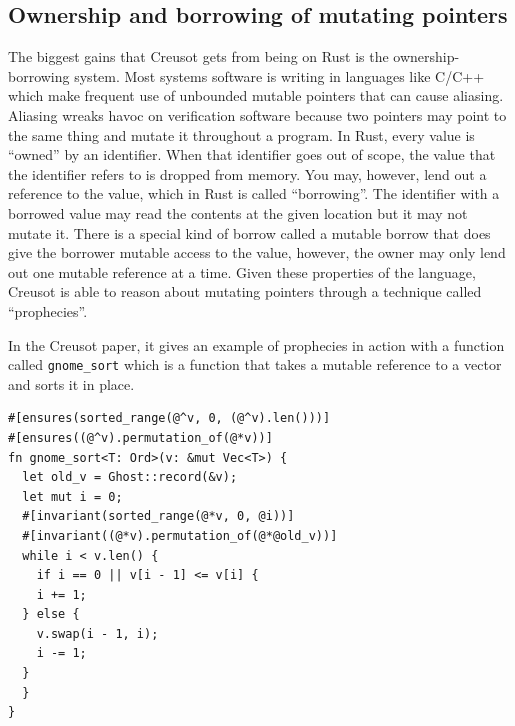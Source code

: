 \documentclass[12pt]{article}
\begin{document}
\subsection{Ownership and borrowing of mutating pointers}
The biggest gains that Creusot gets from being on Rust is the ownership-borrowing system. 
Most systems software is writing in languages like C/C++ which make frequent use of unbounded mutable pointers that can cause aliasing. 
Aliasing wreaks havoc on verification software because two pointers may point to the same thing and mutate it throughout a program. 
In Rust, every value is ``owned'' by an identifier. When that identifier goes out of scope, the value that the identifier refers to is dropped from memory.
You may, however, lend out a reference to the value, which in Rust is called ``borrowing''. 
The identifier with a borrowed value may read the contents at the given location but it may not mutate it. 
There is a special kind of borrow called a mutable borrow that does give the borrower mutable access to the value, however, the owner may only lend out one mutable reference at a time.   
Given these properties of the language, Creusot is able to reason about mutating pointers through a technique called ``prophecies''.

In the Creusot paper, it gives an example of prophecies in action with a function called \texttt{gnome\_sort} which is a function that takes a mutable reference to a vector and sorts it in place. 

\begin{verbatim}
#[ensures(sorted_range(@^v, 0, (@^v).len()))]
#[ensures((@^v).permutation_of(@*v))]
fn gnome_sort<T: Ord>(v: &mut Vec<T>) {
  let old_v = Ghost::record(&v);
  let mut i = 0;
  #[invariant(sorted_range(@*v, 0, @i))]
  #[invariant((@*v).permutation_of(@*@old_v))]
  while i < v.len() {
    if i == 0 || v[i - 1] <= v[i] {
    i += 1;
  } else {
    v.swap(i - 1, i);
    i -= 1;
  }
  }
}
\end{verbatim} 
\end{document}
